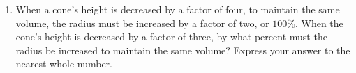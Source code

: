 \documentclass{article}
\begin{document}
\begin{multicols}{2}
\begin{enumerate}
\begin{center}
        \end{center}
        \vspace{3cm}
        \item When a cone's height is decreased by a factor of four, to maintain the same volume, the radius must be increased by a factor of two, or $100\%$.
        When the cone's height is decreased by a factor of three, by what percent must the radius be increased to maintain the same volume?
        Express your answer to the nearest whole number.
        \vspace{3cm}
    \end{enumerate}
\end{multicols}
\end{document}
